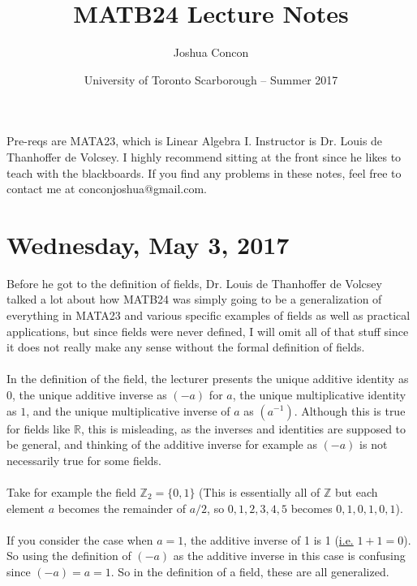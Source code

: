 \documentclass[12pt]{article}
\begin{document}
\title{MATB24 Lecture Notes}
\date{University of Toronto Scarborough -- Summer 2017}
\author{Joshua Concon}
\maketitle

Pre-reqs are MATA23, which is Linear Algebra I.
Instructor is Dr. Louis de Thanhoffer de Volcsey. I highly recommend sitting at the front since he likes to teach with the blackboards. If you find any problems in these notes, feel free to contact me at conconjoshua@gmail.com.

\tableofcontents

\pagebreak

\section{Wednesday, May 3, 2017}

Before he got to the definition of fields, Dr. Louis de Thanhoffer de Volcsey talked a lot about how MATB24 was simply going to be a generalization of everything in MATA23 and various specific examples of fields as well as practical applications, but since fields were never defined, I will omit all of that stuff since it does not really make any sense without the formal definition of fields.\\
\\
In the definition of the field, the lecturer presents the unique additive identity as $0$, the unique additive inverse as $(-a)$ for $a$, the unique multiplicative identity as $1$, and the unique multiplicative inverse of $a$ as $(a^{-1})$. Although this is true for fields like $\mathbb{R}$, this is misleading, as the inverses and identities are supposed to be general, and thinking of the additive inverse for example as $(-a)$ is not necessarily true for some fields.\\
\\
Take for example the field $\mathbb{Z}_2 = \{ 0,1 \}$ (This is essentially all of $\mathbb{Z}$ but each element $a$ becomes the remainder of $a/2$, so $0,1,2,3,4,5$ becomes $0,1,0,1,0,1$).\\
\\
If you consider the case when $a = 1$, the additive inverse of 1 is 1 (\underline{i.e.} $1 + 1 = 0$). So using the definition of $(-a)$ as the additive inverse in this case is confusing since $(-a) = a = 1$. So in the definition of a field, these are all generalized.
\end{document}

